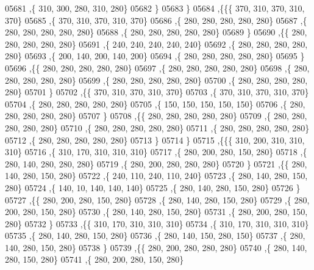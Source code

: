 \begin{DoxyCode}
05681     ,\{   310,   300,   280,   310,   280\}
05682     \}
05683    \}
05684   ,\{\{\{   370,   310,   370,   310,   370\}
05685     ,\{   370,   310,   370,   310,   370\}
05686     ,\{   280,   280,   280,   280,   280\}
05687     ,\{   280,   280,   280,   280,   280\}
05688     ,\{   280,   280,   280,   280,   280\}
05689     \}
05690    ,\{\{   280,   280,   280,   280,   280\}
05691     ,\{   240,   240,   240,   240,   240\}
05692     ,\{   280,   280,   280,   280,   280\}
05693     ,\{   200,   140,   200,   140,   200\}
05694     ,\{   280,   280,   280,   280,   280\}
05695     \}
05696    ,\{\{   280,   280,   280,   280,   280\}
05697     ,\{   280,   280,   280,   280,   280\}
05698     ,\{   280,   280,   280,   280,   280\}
05699     ,\{   280,   280,   280,   280,   280\}
05700     ,\{   280,   280,   280,   280,   280\}
05701     \}
05702    ,\{\{   370,   310,   370,   310,   370\}
05703     ,\{   370,   310,   370,   310,   370\}
05704     ,\{   280,   280,   280,   280,   280\}
05705     ,\{   150,   150,   150,   150,   150\}
05706     ,\{   280,   280,   280,   280,   280\}
05707     \}
05708    ,\{\{   280,   280,   280,   280,   280\}
05709     ,\{   280,   280,   280,   280,   280\}
05710     ,\{   280,   280,   280,   280,   280\}
05711     ,\{   280,   280,   280,   280,   280\}
05712     ,\{   280,   280,   280,   280,   280\}
05713     \}
05714    \}
05715   ,\{\{\{   310,   200,   310,   310,   310\}
05716     ,\{   310,   170,   310,   310,   310\}
05717     ,\{   280,   200,   280,   150,   280\}
05718     ,\{   280,   140,   280,   280,   280\}
05719     ,\{   280,   200,   280,   280,   280\}
05720     \}
05721    ,\{\{   280,   140,   280,   150,   280\}
05722     ,\{   240,   110,   240,   110,   240\}
05723     ,\{   280,   140,   280,   150,   280\}
05724     ,\{   140,    10,   140,   140,   140\}
05725     ,\{   280,   140,   280,   150,   280\}
05726     \}
05727    ,\{\{   280,   200,   280,   150,   280\}
05728     ,\{   280,   140,   280,   150,   280\}
05729     ,\{   280,   200,   280,   150,   280\}
05730     ,\{   280,   140,   280,   150,   280\}
05731     ,\{   280,   200,   280,   150,   280\}
05732     \}
05733    ,\{\{   310,   170,   310,   310,   310\}
05734     ,\{   310,   170,   310,   310,   310\}
05735     ,\{   280,   140,   280,   150,   280\}
05736     ,\{   280,   140,   150,   280,   150\}
05737     ,\{   280,   140,   280,   150,   280\}
05738     \}
05739    ,\{\{   280,   200,   280,   280,   280\}
05740     ,\{   280,   140,   280,   150,   280\}
05741     ,\{   280,   200,   280,   150,   280\}

\end{DoxyCode}
